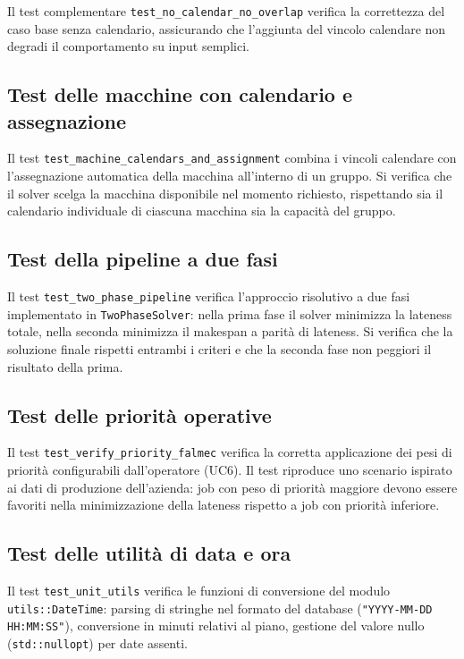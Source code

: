 Il test complementare \texttt{test\_no\_calendar\_no\_overlap} verifica la correttezza del caso base senza calendario, assicurando che l'aggiunta del vincolo calendare non degradi il comportamento su input semplici.

\subsection{Test delle macchine con calendario e assegnazione}

Il test \texttt{test\_machine\_calendars\_and\_assignment} combina i vincoli calendare con l'assegnazione automatica della macchina all'interno di un gruppo. Si verifica che il solver scelga la macchina disponibile nel momento richiesto, rispettando sia il calendario individuale di ciascuna macchina sia la capacità del gruppo.

\subsection{Test della pipeline a due fasi}

Il test \texttt{test\_two\_phase\_pipeline} verifica l'approccio risolutivo a due fasi implementato in \texttt{TwoPhaseSolver}: nella prima fase il solver minimizza la lateness totale, nella seconda minimizza il makespan a parità di lateness. Si verifica che la soluzione finale rispetti entrambi i criteri e che la seconda fase non peggiori il risultato della prima.

\subsection{Test delle priorità operative}

Il test \texttt{test\_verify\_priority\_falmec} verifica la corretta applicazione dei pesi di priorità configurabili dall'operatore (UC6). Il test riproduce uno scenario ispirato ai dati di produzione dell'azienda: job con peso di priorità maggiore devono essere favoriti nella minimizzazione della lateness rispetto a job con priorità inferiore.

\subsection{Test delle utilità di data e ora}

Il test \texttt{test\_unit\_utils} verifica le funzioni di conversione del modulo \texttt{utils::DateTime}: parsing di stringhe nel formato del database (\texttt{"YYYY-MM-DD HH:MM:SS"}), conversione in minuti relativi al piano, gestione del valore nullo (\texttt{std::nullopt}) per date assenti.

